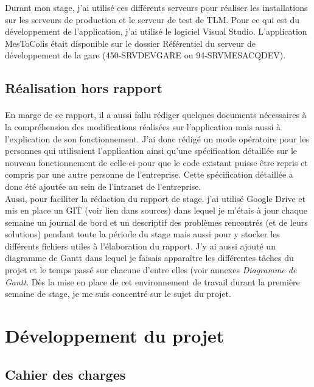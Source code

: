 \documentclass[a4paper,12pt]{extarticle}
\begin{document}
Durant mon stage, j’ai utilisé ces différents serveurs pour réaliser les installations sur les serveurs de production et le serveur de test de TLM. Pour ce qui est du développement de l’application, j’ai utilisé le logiciel Visual Studio. L'application MesToColis était disponible sur le dossier Référentiel du serveur de développement de la gare (450-SRVDEVGARE ou 94-SRVMESACQDEV).
	
	\subsection{Réalisation hors rapport}
		\paragraph{}
	
	En marge de ce rapport, il a aussi fallu rédiger quelques documents nécessaires à la compréhension des modifications réalisées sur l’application mais aussi à l’explication de son fonctionnement. J’ai donc rédigé un mode opératoire pour les personnes qui utilisaient l’application ainsi qu’une spécification détaillée sur le nouveau fonctionnement de celle-ci pour que le code existant puisse être repris et compris par une autre personne de l’entreprise. Cette spécification détaillée a donc été ajoutée au sein de l’intranet de l’entreprise.\\
Aussi, pour faciliter la rédaction du rapport de stage, j’ai utilisé Google Drive et mis en place un GIT (voir lien dans sources) dans lequel je m’étais à jour chaque semaine un journal de bord et un descriptif des problèmes rencontrés (et de leurs solutions) pendant toute la période du stage mais aussi pour y stocker les différents fichiers utiles à l’élaboration du rapport. J’y ai aussi ajouté un diagramme de Gantt dans lequel je faisais apparaître les différentes tâches du projet et le temps passé sur chacune d’entre elles (voir annexes \emph{Diagramme de Gantt}. Dès la mise en place de cet environnement de travail durant la première semaine de stage, je me suis concentré sur le sujet du projet.\\

	\clearpage

	\section{Développement du projet}
	
	\subsection{Cahier des charges}
\end{document}
